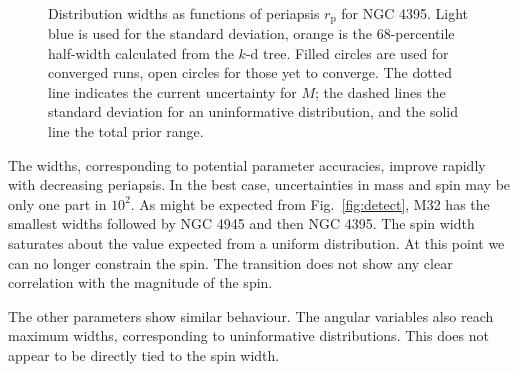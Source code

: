 \documentclass[useAMS,usedcolumn,usegraphicx,usenatbib]{mn2e}
\newcommand{\figref}[1]{Fig.~\ref{fig:#1}}
\newcommand{\sub}[1]{\ensuremath{_\mathrm{#1}}}
\begin{document}
\begin{figure}
\begin{center}
 \quad
{} \\
\caption{Distribution widths as functions of periapsis $r\sub{p}$ for NGC 4395. Light blue is used for the standard deviation, orange is the $68$-percentile half-width calculated from the $k$-d tree. Filled circles are used for converged runs, open circles for those yet to converge. The dotted line indicates the current uncertainty for $M$; the dashed lines the standard deviation for an uninformative distribution, and the solid line the total prior range.\label{fig:sigmas-N4395}}
\end{center}
\end{figure}

The widths, corresponding to potential parameter accuracies, improve rapidly with decreasing periapsis. In the best case, uncertainties in mass and spin may be only one part in $10^2$. As might be expected from \figref{detect}, M32 has the smallest widths followed by NGC 4945 and then NGC 4395. The spin width saturates about the value expected from a uniform distribution. At this point we can no longer constrain the spin. The transition does not show any clear correlation with the magnitude of the spin.

The other parameters show similar behaviour. The angular variables also reach maximum widths, corresponding to uninformative distributions. This does not appear to be directly tied to the spin width.
\end{document}
